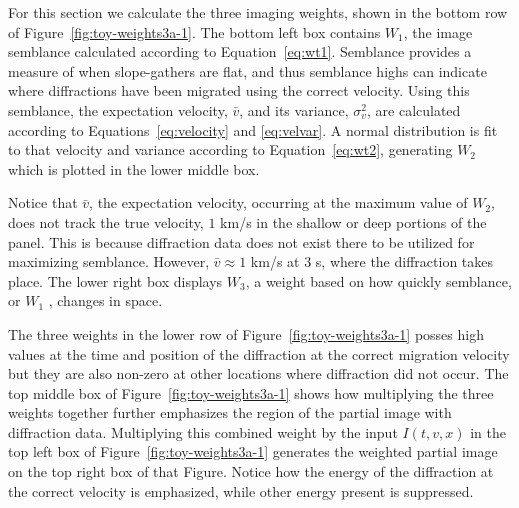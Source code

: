 For this section we calculate the three imaging weights, shown in the bottom row of Figure~\ref{fig:toy-weights3a-1}.  The bottom left box contains $W_1$, the image semblance calculated according to Equation~\ref{eq:wt1}.  Semblance provides a measure of when slope-gathers are flat, and thus semblance highs can indicate where diffractions have been migrated using the correct velocity.  Using this semblance, the expectation velocity, $\bar{v}$, and its variance, $\sigma^2_v$, are calculated according to Equations~\ref{eq:velocity} and \ref{eq:velvar}. A normal distribution is fit to that velocity and variance according to Equation~\ref{eq:wt2}, generating $W_2$ which is plotted in the lower middle box. 
 
Notice that $\bar{v}$, the expectation velocity, occurring at the maximum value of $W_2$, does not track the true velocity, $1$ km/s in the shallow or deep portions of the panel.  This is because diffraction data does not exist there to be utilized for maximizing semblance.  However, $\bar{v} \approx 1$ km/s at 3 s, where the diffraction takes place.  The lower right box displays $W_3$, a weight based on how quickly semblance, or $W_1$ , changes in space.  

The three weights in the lower row of Figure~\ref{fig:toy-weights3a-1} posses high values at the time and position of the diffraction at the correct migration velocity but they are also non-zero at other locations where diffraction did not occur.  The top middle box of Figure~\ref{fig:toy-weights3a-1} shows how multiplying the three weights together further emphasizes the region of the partial image with diffraction data.  Multiplying this combined weight by the input $I(t,v,x)$ in the top left box of Figure~\ref{fig:toy-weights3a-1} generates the weighted partial image on the top right box of that Figure.  Notice how the energy of the diffraction at the correct velocity is emphasized, while other energy present is suppressed. 




